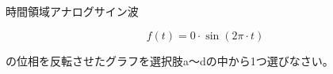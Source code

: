 時間領域アナログサイン波

\[
f(t) = 0 \cdot \sin( 2 \pi \cdot t )
\]

\bigskip
\noindent  の位相を反転させたグラフを選択肢a〜dの中から1つ選びなさい。
